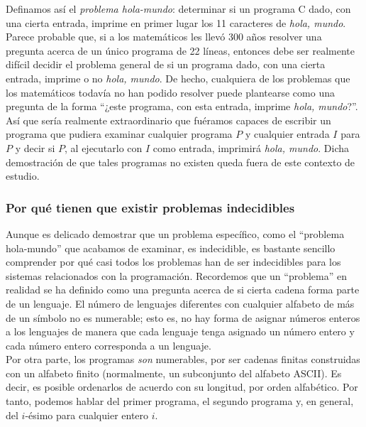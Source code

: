 Definamos así el \emph{problema hola-mundo}: determinar si un programa C dado, con una cierta entrada, imprime en primer lugar los 11 caracteres de \emph{hola, mundo}. \\

Parece probable que, si a los matemáticos les llevó 300 años resolver una pregunta acerca de un único programa de 22 líneas, entonces debe ser realmente difícil decidir el problema general de si un programa dado, con una cierta entrada, imprime o no \emph{hola, mundo}. De hecho, cualquiera de los problemas que los matemáticos todavía no han podido resolver puede plantearse como una pregunta de la forma ``¿este programa, con esta entrada, imprime \emph{hola, mundo}?''. Así que sería realmente extraordinario que fuéramos capaces de escribir un programa que pudiera examinar cualquier programa $P$ y cualquier entrada $I$ para $P$ y decir si $P$, al ejecutarlo con $I$ como entrada, imprimirá \emph{hola, mundo}. Dicha demostración de que tales programas no existen queda fuera de este contexto de estudio.\\

\subsubsection{Por qué tienen que existir problemas indecidibles}

Aunque es delicado demostrar que un problema específico, como el ``problema hola-mundo'' que acabamos de examinar, es indecidible, es bastante sencillo comprender por qué casi todos los problemas han de ser indecidibles para los sistemas relacionados con la programación. Recordemos que un ``problema'' en realidad se ha definido como una pregunta acerca de si cierta cadena forma parte de un lenguaje. El número de lenguajes diferentes con cualquier alfabeto de más de un símbolo no es numerable; esto es, no hay forma de asignar números enteros a los lenguajes de manera que cada lenguaje tenga asignado un número entero y cada número entero corresponda a un lenguaje. \\

Por otra parte, los programas \emph{son} numerables, por ser cadenas finitas construidas con un alfabeto finito (normalmente, un subconjunto del alfabeto ASCII). Es decir, es posible ordenarlos de acuerdo con su longitud, por orden alfabético. Por tanto, podemos hablar del primer programa, el segundo programa y, en general, del $i$-ésimo para cualquier entero $i$.\\

